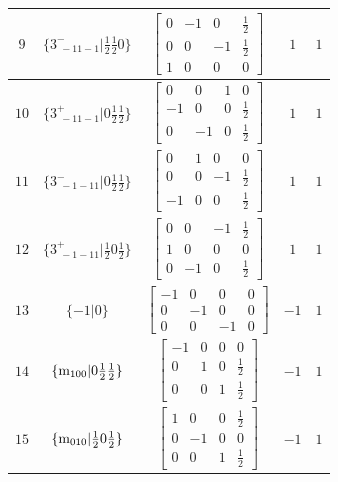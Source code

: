 \documentclass[fleqn,8pt]{jsarticle}
\begin{document}
\begin{longtable}{ccccc}
$ 9 $ & $ \{3^{-}_{\,\,-11-1}|\frac{1}{2} \frac{1}{2} 0\} $ & $ \begin{bmatrix} 0 & -1 & 0 & \frac{1}{2} \\ 0 & 0 & -1 & \frac{1}{2} \\ 1 & 0 & 0 & 0 \end{bmatrix} $ & $ 1 $ & $ 1 $ \\ \hline
$ 10 $ & $ \{3^{+}_{\,\,-11-1}|0 \frac{1}{2} \frac{1}{2}\} $ & $ \begin{bmatrix} 0 & 0 & 1 & 0 \\ -1 & 0 & 0 & \frac{1}{2} \\ 0 & -1 & 0 & \frac{1}{2} \end{bmatrix} $ & $ 1 $ & $ 1 $ \\ \hline
$ 11 $ & $ \{3^{-}_{\,\,-1-11}|0 \frac{1}{2} \frac{1}{2}\} $ & $ \begin{bmatrix} 0 & 1 & 0 & 0 \\ 0 & 0 & -1 & \frac{1}{2} \\ -1 & 0 & 0 & \frac{1}{2} \end{bmatrix} $ & $ 1 $ & $ 1 $ \\ \hline
$ 12 $ & $ \{3^{+}_{\,\,-1-11}|\frac{1}{2} 0 \frac{1}{2}\} $ & $ \begin{bmatrix} 0 & 0 & -1 & \frac{1}{2} \\ 1 & 0 & 0 & 0 \\ 0 & -1 & 0 & \frac{1}{2} \end{bmatrix} $ & $ 1 $ & $ 1 $ \\ \hline
$ 13 $ & $ \{-1|0\} $ & $ \begin{bmatrix} -1 & 0 & 0 & 0 \\ 0 & -1 & 0 & 0 \\ 0 & 0 & -1 & 0 \end{bmatrix} $ & $ -1 $ & $ 1 $ \\ \hline
$ 14 $ & $ \{{\rm m}_{100}|0 \frac{1}{2} \frac{1}{2}\} $ & $ \begin{bmatrix} -1 & 0 & 0 & 0 \\ 0 & 1 & 0 & \frac{1}{2} \\ 0 & 0 & 1 & \frac{1}{2} \end{bmatrix} $ & $ -1 $ & $ 1 $ \\ \hline
$ 15 $ & $ \{{\rm m}_{010}|\frac{1}{2} 0 \frac{1}{2}\} $ & $ \begin{bmatrix} 1 & 0 & 0 & \frac{1}{2} \\ 0 & -1 & 0 & 0 \\ 0 & 0 & 1 & \frac{1}{2} \end{bmatrix} $ & $ -1 $ & $ 1 $ \\ \hline

\end{longtable}
\end{document}
